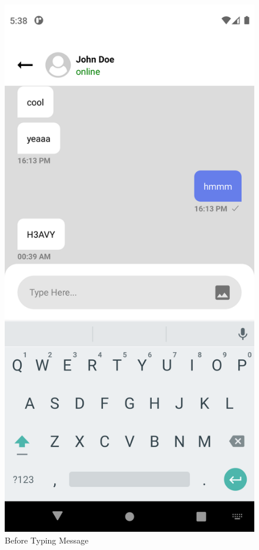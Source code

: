 \begin{figure}[!htb]
	\begin{minipage}{0.48\textwidth}
		\centering
		\includegraphics[width=0.8\linewidth]{figures/Testing/chat1.png}
		\caption{Before Typing Message}\label{Fig:Data1}
	\end{minipage}\hfill
	\begin{minipage}{0.48\textwidth}
		\centering

\end{minipage}
\end{figure}
